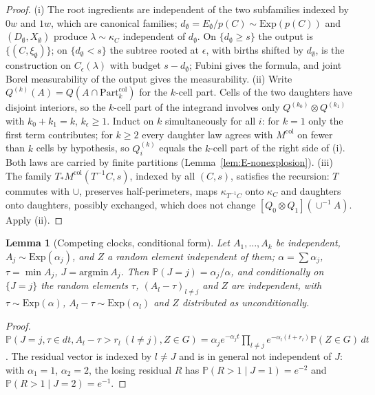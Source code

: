 \documentclass[11pt]{article}
\theoremstyle{plain}
\newtheorem{lemma}[theorem]{Lemma}
\theoremstyle{definition}
\theoremstyle{remark}
\newcommand{\PP}{\mathbb{P}}
\newcommand{\Part}{\mathrm{Part}}
\newcommand{\Mcol}{M^{\mathrm{col}}}
\begin{document}
\begin{proof}
(i) The root ingredients are independent of the two subfamilies indexed by
$0w$ and $1w$, which are canonical families; $d_\emptyset=E_\emptyset/p(C)\sim\mathrm{Exp}(p(C))$ and
$(D_\emptyset,X_\emptyset)$ produce $\lambda\sim\kappa_C$ independent of $d_\emptyset$. On $\{d_\emptyset\ge s\}$ the output
is $\{(C,\xi_\emptyset)\}$; on $\{d_\emptyset<s\}$ the subtree rooted at $\epsilon$, with births shifted by
$d_\emptyset$, is the construction on $C_\epsilon(\lambda)$ with budget $s-d_\emptyset$; Fubini gives the
formula, and joint Borel measurability of the output gives the measurability.
(ii) Write $Q^{(k)}(A)=Q(A\cap\Part^{\mathrm{col}}_k)$ for the $k$-cell part. Cells of the two
daughters have disjoint interiors, so the $k$-cell part of the integrand involves
only $Q^{(k_0)}\otimes Q^{(k_1)}$ with $k_0+k_1=k$, $k_\epsilon\ge1$. Induct on $k$ simultaneously for
all $i$: for $k=1$ only the first term contributes; for $k\ge2$ every daughter law
agrees with $\Mcol$ on fewer than $k$ cells by hypothesis, so $Q^{(k)}_i$ equals the
$k$-cell part of the right side of (i). Both laws are carried by finite partitions
(Lemma~\ref{lem:E-nonexplosion}). (iii) The family $T_*\Mcol(T^{-1}C,s)$, indexed by all
$(C,s)$, satisfies the recursion: $T$ commutes with $\cup$, preserves half-perimeters,
maps $\kappa_{T^{-1}C}$ onto $\kappa_C$ and daughters onto daughters, possibly exchanged, which
does not change $[Q_0\otimes Q_1](\cup^{-1}A)$. Apply (ii).
\end{proof}

\begin{lemma}[Competing clocks, conditional form]\label{lem:E-clocks}
Let $A_1,\dots,A_k$ be independent, $A_j\sim\mathrm{Exp}(\alpha_j)$, and $Z$ a random element
independent of them; $\alpha=\sum\alpha_j$, $\tau=\min A_j$, $J=\mathrm{argmin}\,A_j$. Then
$\PP(J=j)=\alpha_j/\alpha$, and conditionally on $\{J=j\}$ the random elements $\tau$,
$(A_l-\tau)_{l\ne j}$ and $Z$ are independent, with $\tau\sim\mathrm{Exp}(\alpha)$, $A_l-\tau\sim\mathrm{Exp}(\alpha_l)$ and $Z$
distributed as unconditionally.
\end{lemma}

\begin{proof}
$\PP(J=j,\tau\in dt,A_l-\tau>r_l\ (l\ne j),Z\in G)=\alpha_je^{-\alpha_jt}\prod_{l\ne j}e^{-\alpha_l(t+r_l)}\PP(Z\in G)\,dt$.
The residual vector is indexed by $l\ne J$ and is in general not independent of $J$:
with $\alpha_1=1$, $\alpha_2=2$, the losing residual $R$ has $\PP(R>1\mid J=1)=e^{-2}$ and
$\PP(R>1\mid J=2)=e^{-1}$.
\end{proof}
\end{document}
